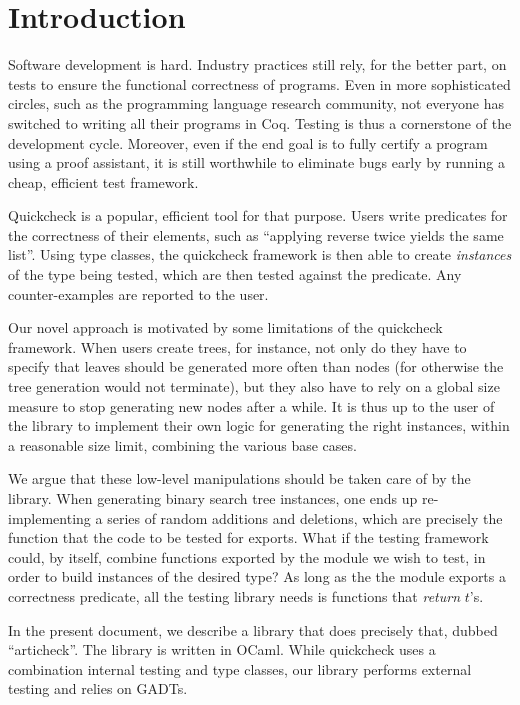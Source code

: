 \section{Introduction}

Software development is hard. Industry practices still rely, for the better
part, on tests to ensure the functional correctness of programs. Even in more
sophisticated circles, such as the programming language research community, not
everyone has switched to writing all their programs in Coq. Testing is thus a
cornerstone of the development cycle. Moreover, even if the end goal is to fully
certify a program using a proof assistant, it is still worthwhile to eliminate
bugs early by running a cheap, efficient test framework.

Quickcheck is a popular, efficient tool for that purpose. Users write predicates
for the correctness of their elements, such as ``applying reverse twice yields
the same list''. Using type classes, the quickcheck framework is then able to
create \emph{instances} of the type being tested, which are then tested against
the predicate. Any counter-examples are reported to the user.

Our novel approach is motivated by some limitations of the quickcheck framework.
When users create trees, for instance, not only do they have to specify that
leaves should be generated more often than nodes (for otherwise the tree
generation would not terminate), but they also have to rely on a global size
measure to stop generating new nodes after a while. It is thus up to the user of
the library to implement their own logic for generating the right instances,
within a reasonable size limit, combining the various base cases.

We argue that these low-level manipulations should be taken care of by the
library. When generating binary search tree instances, one ends up
re-implementing a series of random additions and deletions, which are precisely
the function that the code to be tested for exports. What if the testing
framework could, by itself, combine functions exported by the module we wish to
test, in order to build instances of the desired type? As long as the the module
exports a correctness predicate, all the testing library needs is functions
that \emph{return} $t$'s.

In the present document, we describe a library that does precisely that, dubbed
``articheck''. The library is written in OCaml. While quickcheck uses a
combination internal testing and type classes, our library performs external
testing and relies on GADTs.
